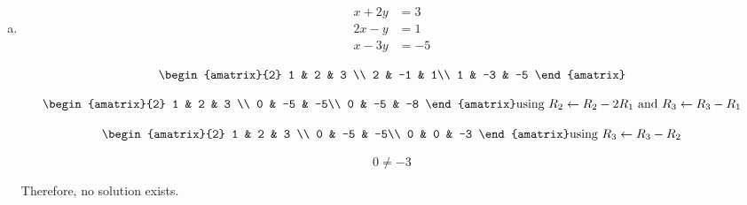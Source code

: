 \documentclass[11pt]{article}
\begin{document}
\begin{enumerate}[(a)]
\begin{Answer}
	\end{Answer}
    
    \item
    \begin{align*}
        x + 2y &= 3 \\
        2x - y &= 1 \\
        x - 3y &= -5
    \end{align*}
    
    \begin{Answer}
		$$\begin{amatrix}{2}
   		1 & 2 & 3 \\  
		2 & -1 & 1\\
		1 & -3 & -5
		\end{amatrix}$$
		
		$$\begin{amatrix}{2}
   		1 & 2 & 3 \\  
		0 & -5 & -5\\
		0 & -5 & -8
		\end{amatrix} \text{using } R_2 \leftarrow R_2 - 2R_1 \text{ and }  R_3 \leftarrow R_3 - R_1$$
		
		$$\begin{amatrix}{2}
   		1 & 2 & 3 \\  
		0 & -5 & -5\\
		0 & 0 & -3
		\end{amatrix} \text{using } R_3 \leftarrow R_3 - R_2 $$
		
		$$0 \neq -3$$
		
		Therefore, no solution exists.
	\end{Answer}

\end{enumerate}
\end{document}
